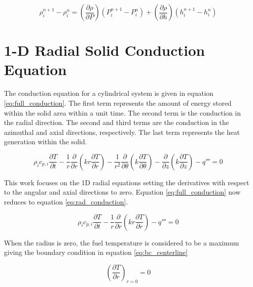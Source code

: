     \begin{equation}
    	\label{eq:EOS}
    	\rho_{i}^{n+1} - \rho_{i}^{n} = 
    	\left( \frac{ \partial \rho }{\partial P} \right) 
    	\left( P_{i}^{n+1} - P_{i}^{n} \right)
    	+ 
    	\left( \frac{ \partial \rho }{\partial h} \right) 
    	\left( h_{i}^{n+1} - h_{i}^{n} \right)
    \end{equation}

\section{1-D Radial Solid Conduction Equation} \label{sec:rad_conduction}

The conduction equation for a cylindrical system is given in equation \ref{eq:full_conduction}.
The first  term represents the amount of energy stored within the solid area within
a unit  time. The second term is the conduction in the radial direction. The
second  and third terms are the conduction in the azimuthal and axial
directions,  respectively. The last term represents the heat generation within
the solid.

\begin{equation}
	\label{eq:full_conduction}
	  \rho_{i}c_{p,i}\frac{\partial T}{\partial t}
	- \frac{1}{r}\frac{\partial}{\partial r}\left( 
		kr\frac{\partial T}{\partial r}\right)
	- \frac{1}{r^{2}}\frac{\partial}{\partial \theta}\left(
		k\frac{\partial T}{\partial \theta}\right)
	- \frac{\partial}{\partial z}\left(k\frac{\partial T}{\partial z}\right) 
	- q'''
	= 0
\end{equation}

This work focuses on the 1D radial equations setting the derivatives with
respect to the angular and axial directions to zero. Equation \ref{eq:full_conduction} now reduces
to equation \ref{eq:rad_conduction}.

\begin{equation}
	\label{eq:rad_conduction}
	  \rho_{i}c_{p,i}\frac{\partial T}{\partial t}
	- \frac{1}{r}\frac{\partial}{\partial r}\left( 
		kr\frac{\partial T}{\partial r}\right)
	- q'''
	= 0
\end{equation}

When the radius is zero, the fuel temperature is considered to be a maximum
giving the boundary condition in equation \ref{eq:bc_centerline}

\begin{equation}
	\label{eq:bc_centerline}
	\left(\frac{\partial T}{\partial r}\right)_{r=0}=0
\end{equation}

